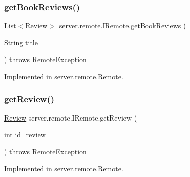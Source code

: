 \mbox{\label{interfaceserver_1_1remote_1_1_i_remote_a600254593b70d9757190475d3435b390}} 
\subsubsection{\texorpdfstring{get\+Book\+Reviews()}{getBookReviews()}}
{\footnotesize\ttfamily List$<$\hyperlink{classserver_1_1data_1_1_review}{Review}$>$ server.\+remote.\+I\+Remote.\+get\+Book\+Reviews (\begin{DoxyParamCaption}\item[{String}]{title }\end{DoxyParamCaption}) throws Remote\+Exception}



Implemented in \hyperlink{classserver_1_1remote_1_1_remote_a501e5c5fe847917c9615f0772864a147}{server.\+remote.\+Remote}.

\mbox{\label{interfaceserver_1_1remote_1_1_i_remote_a7b3462a438579c85dc7f097acf9cec41}} 
\subsubsection{\texorpdfstring{get\+Review()}{getReview()}}
{\footnotesize\ttfamily \hyperlink{classserver_1_1data_1_1_review}{Review} server.\+remote.\+I\+Remote.\+get\+Review (\begin{DoxyParamCaption}\item[{int}]{id\+\_\+review }\end{DoxyParamCaption}) throws Remote\+Exception}



Implemented in \hyperlink{classserver_1_1remote_1_1_remote_a98bd7181568c637a6cbcc0b72ebb9f95}{server.\+remote.\+Remote}.

\mbox{\label{interfaceserver_1_1remote_1_1_i_remote_ab741cf58a7e2b18ba36069d14d9d04ef}} 
